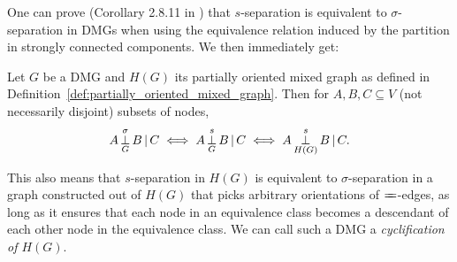 One can prove (Corollary 2.8.11 in \cite{FM17}) that $s$-separation is equivalent to $\sigma$-separation in DMGs when using the equivalence relation induced by the partition in strongly connected components.
We then immediately get:
\begin{Prp}\label{prp:sigma_sep_as_s_sep}
  Let $G$ be a DMG and $H(G)$ its partially oriented mixed graph as defined in Definition~\ref{def:partially_oriented_mixed_graph}.
  Then for $A, B, C \subseteq V$ (not necessarily disjoint) subsets of nodes,
  $$A \operatorname*{\perp}^{\sigma}_G B \operatorname*{|} C \iff A \operatorname*{\perp}^s_G B \operatorname*{|} C \iff A \operatorname*{\perp}^s_{H(G)} B \operatorname*{|} C.$$
\end{Prp}
This also means that $s$-separation in $H(G)$ is equivalent to $\sigma$-separation in a graph constructed out of $H(G)$ that picks arbitrary orientations of $\otto$-edges, as long as it ensures that each node in an equivalence class becomes a descendant of each other node in the equivalence class. We can call such a DMG a \emph{cyclification of $H(G)$}.
